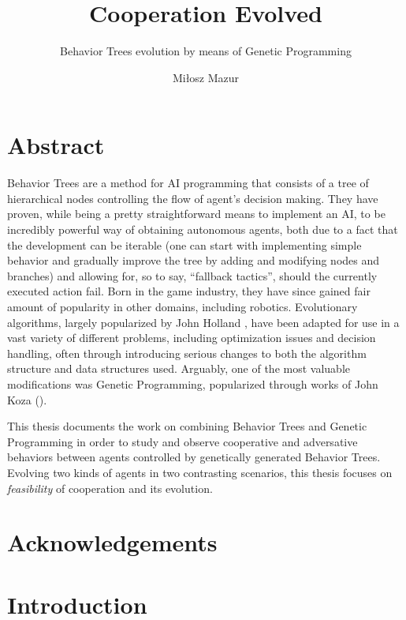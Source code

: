 \documentclass[12pt]{scrreprt}
\begin{document}
\author{Miłosz Mazur}
\title{Cooperation Evolved}
\subtitle{Behavior Trees evolution by means of Genetic Programming}
\maketitle

\newpage
\chapter*{Abstract}
Behavior Trees are a method for AI programming that consists of a tree of hierarchical nodes controlling the flow of agent's decision making. They have proven, while being a pretty straightforward means to implement an AI, to be incredibly powerful way of obtaining autonomous agents, both due to a fact that the development can be iterable (one can start with implementing simple behavior and gradually improve the tree by adding and modifying nodes and branches) and allowing for, so to say, ``fallback tactics'', should the currently executed action fail.  Born in the game industry, they have since gained fair amount of popularity in other domains, including robotics.
Evolutionary algorithms, largely popularized by John Holland \cite{hollandadaptation}, have been adapted for use in a vast variety of different problems, including optimization issues and decision handling, often through introducing serious changes to both the algorithm structure and data structures used. Arguably, one of the most valuable modifications was Genetic Programming, popularized through works of John Koza (\cite{kozagp}).

This thesis documents the work on combining Behavior Trees and Genetic Programming in order to study and observe cooperative and adversative behaviors between agents controlled by genetically generated Behavior Trees. Evolving two kinds of agents in two contrasting scenarios, this thesis focuses on \textit{feasibility} of cooperation and its evolution.  %

\chapter*{Acknowledgements}

\tableofcontents
\listoffigures
\listoftables
\chapter{Introduction}
\label{chapter_introduction}

\end{document}
